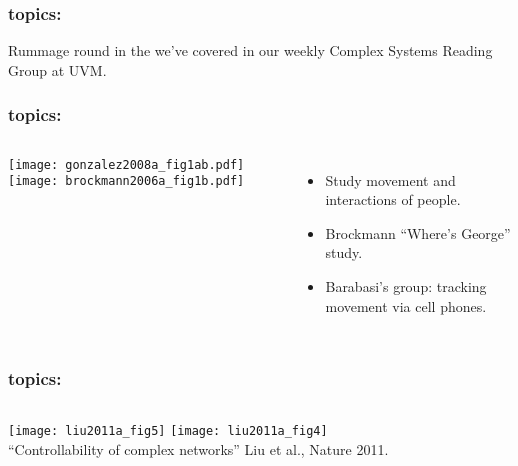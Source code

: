 \begin{frame}
  \frametitle{topics:}
  
  \begin{block}{}
    Rummage round in the 
    we've covered
    in our weekly Complex Systems Reading Group at UVM.
  \end{block}

\end{frame}



\begin{frame}
  \frametitle{topics:}

  \begin{block}{}
    \begin{columns}
      \texttt{[image: gonzalez2008a\_fig1ab.pdf]}
      \texttt{[image: brockmann2006a\_fig1b.pdf]}
      \begin{itemize}
      \item<1-> 
        Study movement and interactions of people.
      \item<1-> 
        Brockmann \etal\cite{brockmann2006a} ``Where's George'' study.
      \item<1-> 
        Barabasi's group: tracking movement
        via cell phones\cite{gonzalez2008a}.
      \end{itemize}
    \end{columns}
  \end{block}

\end{frame}






\begin{frame}
  \frametitle{topics:}

  \begin{block}{}
    \begin{columns}
      \texttt{[image: liu2011a\_fig5]}
      \texttt{[image: liu2011a\_fig4]}\\
      ``Controllability of complex networks''\cite{liu2011a}
      Liu et al., Nature 2011.
    \end{columns}
  \end{block}

\end{frame}


